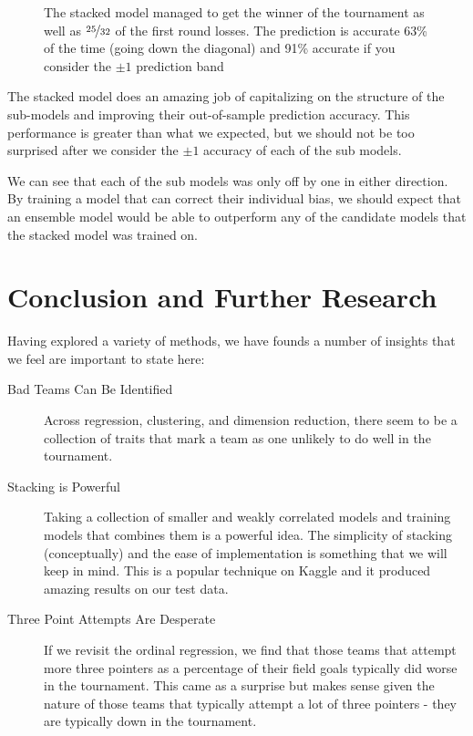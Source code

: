 \documentclass[10pt,a4paper, hidelinks]{article} %
\begin{document}
\begin{figure}[H]
	\centering
	
	\caption{The stacked model managed to get the winner of the tournament as well as $\nicefrac{25}{32}$ of the first round losses. The prediction is accurate 63\% of the time (going down the diagonal) and 91\% accurate if you consider the $\pm 1$ prediction band}
\end{figure}


The stacked model does an amazing job of capitalizing on the structure of the sub-models and improving their out-of-sample prediction accuracy. This performance is greater than what we expected, but we should not be too surprised after we consider the $\pm1$ accuracy of each of the sub models. 

We can see that each of the sub models was only off by one in either direction. By training a model that can correct their individual bias, we should expect that an ensemble model would be able to outperform any of the candidate models that the stacked model was trained on. 

\section{Conclusion and Further Research}

Having explored a variety of methods, we have founds a number of insights that we feel are important to state here:
\begin{description}
	\item[Bad Teams Can Be Identified] Across regression, clustering, and dimension reduction, there seem to be a collection of traits that mark a team as one unlikely to do well in the tournament.
	\item[Stacking is Powerful] Taking a collection of smaller and weakly correlated models and training models that combines them is a powerful idea. The simplicity of stacking (conceptually) and the ease of implementation is something that we will keep in mind. This is a popular technique on Kaggle and it produced amazing results on our test data.
	\item[Three Point Attempts Are Desperate] If we revisit the ordinal regression, we find that those teams that attempt more three pointers as a percentage of their field goals typically did worse in the tournament. This came as a surprise but makes sense given the nature of those teams that typically attempt a lot of three pointers - they are typically down in the tournament.
\end{description}
\end{document}
